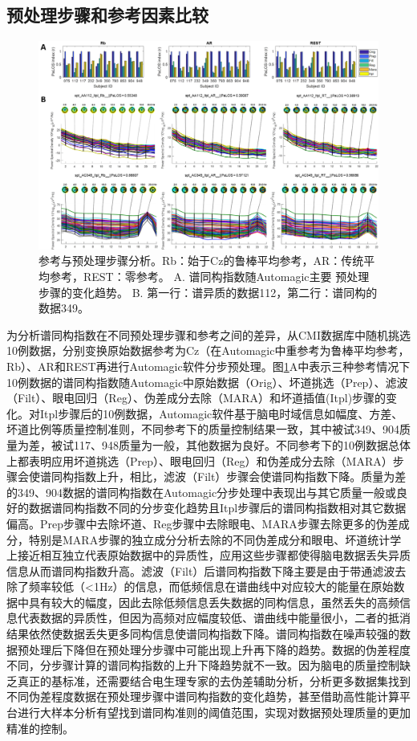 \subsection{预处理步骤和参考因素比较}
\begin{figure}[!h]
	\includegraphics[width=15cm]{pic/palos/step.png}
	\caption{参考与预处理步骤分析。Rb：始于Cz的鲁棒平均参考，AR：传统平均参考，REST：零参考。 A. 谱同构指数随Automagic主要
	预处理步骤的变化趋势。 B. 第一行：谱异质的数据112，第二行：谱同构的数据349。}
	\label{step}
\end{figure}
为分析谱同构指数在不同预处理步骤和参考之间的差异，从CMI数据库中随机挑选10例数据，分别变换原始数据参考为Cz（在Automagic中重参考为鲁棒平均参考，Rb）、AR和REST再进行Automagic软件分步预处理。图\ref{step}A中表示三种参考情况下10例数据的谱同构指数随Automagic中原始数据（Orig）、坏道挑选（Prep）、滤波（Filt）、眼电回归（Reg）、伪差成分去除（MARA）和坏道插值(Itpl)步骤的变化。对Itpl步骤后的10例数据，Automagic软件基于脑电时域信息如幅度、方差、坏道比例等质量控制准则，不同参考下的质量控制结果一致，其中被试349、904质量为差，被试117、948质量为一般，其他数据为良好。不同参考下的10例数据总体上都表明应用坏道挑选（Prep）、眼电回归（Reg）和伪差成分去除（MARA）步骤会使谱同构指数上升，相比，滤波（Filt）步骤会使谱同构指数下降。质量为差的349、904数据的谱同构指数在Automagic分步处理中表现出与其它质量一般或良好的数据谱同构指数不同的分步变化趋势且Itpl步骤后的谱同构指数相对其它数据偏高。Prep步骤中去除坏道、Reg步骤中去除眼电、MARA步骤去除更多的伪差成分，特别是MARA步骤的独立成分分析去除的不同伪差成分和眼电、坏道统计学上接近相互独立代表原始数据中的异质性，应用这些步骤都使得脑电数据丢失异质信息从而谱同构指数升高。滤波（Filt）后谱同构指数下降主要是由于带通滤波去除了频率较低（<1Hz）的信息，而低频信息在谱曲线中对应较大的能量在原始数据中具有较大的幅度，因此去除低频信息丢失数据的同构信息，虽然丢失的高频信息代表数据的异质性，但因为高频对应幅度较低、谱曲线中能量很小，二者的抵消结果依然使数据丢失更多同构信息使谱同构指数下降。谱同构指数在噪声较强的数据预处理后下降但在预处理分步骤中可能出现上升再下降的趋势。数据的伪差程度不同，分步骤计算的谱同构指数的上升下降趋势就不一致。因为脑电的质量控制缺乏真正的基标准，还需要结合电生理专家的去伪差辅助分析，分析更多数据集找到不同伪差程度数据在预处理步骤中谱同构指数的变化趋势，甚至借助高性能计算平台进行大样本分析有望找到谱同构准则的阈值范围，实现对数据预处理质量的更加精准的控制。

